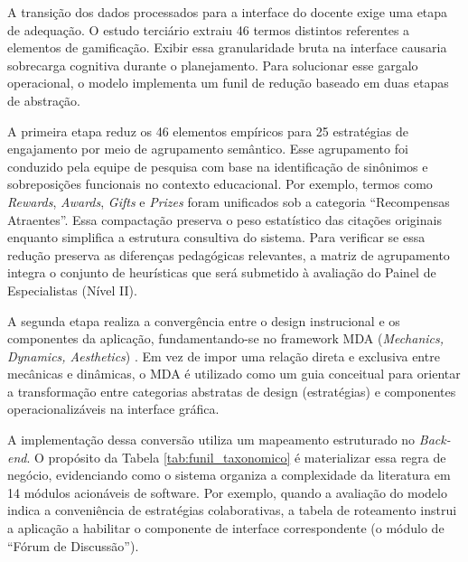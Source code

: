 A transição dos dados processados para a interface do docente exige uma etapa de adequação. O estudo terciário extraiu 46 termos distintos referentes a elementos de gamificação. Exibir essa granularidade bruta na interface causaria sobrecarga cognitiva durante o planejamento. Para solucionar esse gargalo operacional, o modelo implementa um funil de redução baseado em duas etapas de abstração.

A primeira etapa reduz os 46 elementos empíricos para 25 estratégias de engajamento por meio de agrupamento semântico. Esse agrupamento foi conduzido pela equipe de pesquisa com base na identificação de sinônimos e sobreposições funcionais no contexto educacional. Por exemplo, termos como \textit{Rewards}, \textit{Awards}, \textit{Gifts} e \textit{Prizes} foram unificados sob a categoria ``Recompensas Atraentes''. Essa compactação preserva o peso estatístico das citações originais enquanto simplifica a estrutura consultiva do sistema. Para verificar se essa redução preserva as diferenças pedagógicas relevantes, a matriz de agrupamento integra o conjunto de heurísticas que será submetido à avaliação do Painel de Especialistas (Nível II).

A segunda etapa realiza a convergência entre o design instrucional e os componentes da aplicação, fundamentando-se no framework MDA (\textit{Mechanics, Dynamics, Aesthetics}) \cite{hunicke2004mda}. Em vez de impor uma relação direta e exclusiva entre mecânicas e dinâmicas, o MDA é utilizado como um guia conceitual para orientar a transformação entre categorias abstratas de design (estratégias) e componentes operacionalizáveis na interface gráfica.

A implementação dessa conversão utiliza um mapeamento estruturado no \textit{Back-end}. O propósito da Tabela \ref{tab:funil_taxonomico} é materializar essa regra de negócio, evidenciando como o sistema organiza a complexidade da literatura em 14 módulos acionáveis de software. Por exemplo, quando a avaliação do modelo indica a conveniência de estratégias colaborativas, a tabela de roteamento instrui a aplicação a habilitar o componente de interface correspondente (o módulo de ``Fórum de Discussão'').

